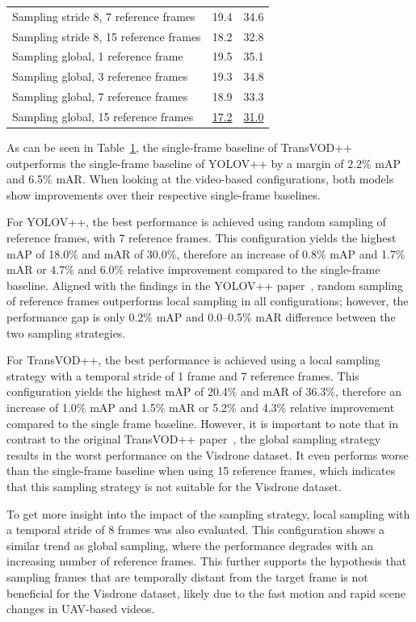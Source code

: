 \documentclass[final,twoside]{vutinfth}
\begin{document}
\begin{table}[htbp]
\begin{tabular}{p{} c c}
Sampling stride 8, 7 reference frames        & 19.4 & 34.6 \\
Sampling stride 8, 15 reference frames       & 18.2 & 32.8 \\
Sampling global, 1 reference frame         & 19.5 & 35.1 \\
Sampling global, 3 reference frames        & 19.3 & 34.8 \\
Sampling global, 7 reference frames        & 18.9 & 33.3 \\
Sampling global, 15 reference frames       & \underline{17.2} & \underline{31.0} \\
\bottomrule
\end{tabular}\label{tab:clean_results}
\end{table}

As can be seen in Table~\ref{tab:clean_results}, the single-frame baseline of TransVOD++ outperforms the single-frame baseline of YOLOV++ by a margin of 2.2\% mAP and 6.5\% mAR.\@
When looking at the video-based configurations, both models show improvements over their respective single-frame baselines.

For YOLOV++, the best performance is achieved using random sampling of reference frames, with 7 reference frames.
This configuration yields the highest mAP of 18.0\% and mAR of 30.0\%, therefore an increase of 0.8\% mAP and 1.7\% mAR or 4.7\% and 6.0\% relative improvement compared to the single-frame baseline.
Aligned with the findings in the YOLOV++ paper~\cite{shi2024yolovpp}, random sampling of reference frames outperforms local sampling in all configurations; however, the performance gap is only 0.2\% mAP and 0.0--0.5\% mAR difference between the two sampling strategies.

For TransVOD++, the best performance is achieved using a local sampling strategy with a temporal stride of 1 frame and 7 reference frames.
This configuration yields the highest mAP of 20.4\% and mAR of 36.3\%, therefore an increase of 1.0\% mAP and 1.5\% mAR or 5.2\% and 4.3\% relative improvement compared to the single frame baseline.
However, it is important to note that in contrast to the original TransVOD++ paper~\cite{zhou2023transvodpp}, the global sampling strategy results in the worst performance on the Visdrone dataset.
It even performs worse than the single-frame baseline when using 15 reference frames, which indicates that this sampling strategy is not suitable for the Visdrone dataset.

To get more insight into the impact of the sampling strategy, local sampling with a temporal stride of 8 frames was also evaluated.
This configuration shows a similar trend as global sampling, where the performance degrades with an increasing number of reference frames.
This further supports the hypothesis that sampling frames that are temporally distant from the target frame is not beneficial for the Visdrone dataset, likely due to the fast motion and rapid scene changes in UAV-based videos.
\end{document}
